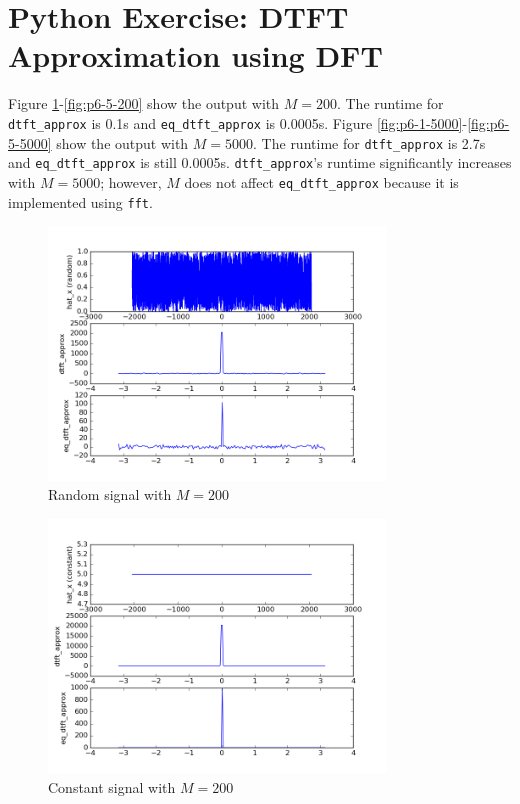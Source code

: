 \section{Python Exercise: DTFT Approximation using DFT}\label{sec:p6}
Figure \ref{fig:p6-1-200}-\ref{fig:p6-5-200} show the output with $M=200$. The runtime for \texttt{dtft\_approx} is 0.1s and \texttt{eq\_dtft\_approx} is 0.0005s. Figure \ref{fig:p6-1-5000}-\ref{fig:p6-5-5000} show the output with $M=5000$. The runtime for \texttt{dtft\_approx} is 2.7s and \texttt{eq\_dtft\_approx} is still 0.0005s. \texttt{dtft\_approx}'s runtime significantly increases with $M=5000$; however, $M$ does not affect \texttt{eq\_dtft\_approx} because it is implemented using \texttt{fft}.

\begin{figure}[htbp]
	\centering
	\includegraphics[width=0.8\textwidth]{images/p6-1-200}
	\caption{Random signal with $M=200$}
	\label{fig:p6-1-200}
\end{figure}

\begin{figure}[htbp]
	\centering
	\includegraphics[width=0.8\textwidth]{images/p6-2-200}
	\caption{Constant signal with $M=200$}
	\label{fig:p6-2-200}
\end{figure}

